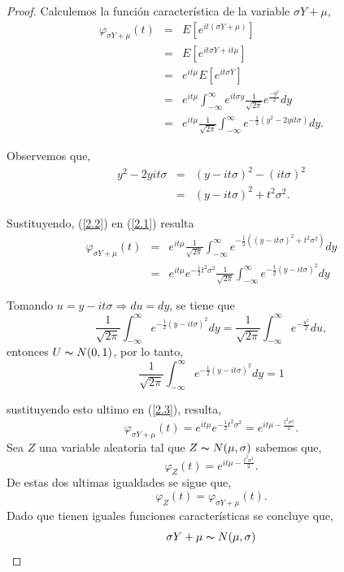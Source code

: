 \documentclass[
  letterpaper,
  DIV=11,
  numbers=noendperiod]{scrreprt}
\theoremstyle{definition}
\theoremstyle{plain}
\theoremstyle{remark}
\begin{document}
\begin{proof}

Calculemos la función característica de la variable \(\sigma Y+\mu\),
\begin{eqnarray}\label{2.1}
\varphi_{\sigma Y+\mu}(t) & = & E\left[e^{it(\sigma Y+\mu)}\right]\nonumber\\
& = & E\left[e^{it\sigma Y+it\mu}\right]\nonumber\\
& = & e^{it\mu}E\left[e^{it\sigma Y}\right]\nonumber\\
& = & e^{it\mu}\int_{-\infty}^{\infty}e^{it\sigma y}\frac{1}{\sqrt{2\pi}}e^{\frac{-y^{2}}{2}}dy\nonumber\\
& = & e^{it\mu}\frac{1}{\sqrt{2\pi}}\int_{-\infty}^{\infty}e^{-\frac{1}{2}(y^{2}-2yit\sigma) }dy.
\end{eqnarray}

Observemos que, \begin{eqnarray}\label{2.2}
y^{2}-2yit\sigma & = & (y-it\sigma)^{2}-(it\sigma)^{2}\nonumber\\
& = & (y-it\sigma)^{2}+t^{2}\sigma^{2}.
\end{eqnarray}

Sustituyendo, (\ref{2.2}) en (\ref{2.1}) resulta
\begin{eqnarray}\label{2.3}
\varphi_{\sigma Y+\mu}(t) & = & e^{it\mu}\frac{1}{\sqrt{2\pi}}\int_{-\infty}^{\infty}e^{-\frac{1}{2}((y-it\sigma)^{2}+t^{2}\sigma^{2}) }dy\nonumber\\
& = & e^{it\mu}e^{-\frac{1}{2}t^{2}\sigma^{2}}\frac{1}{\sqrt{2\pi}}\int_{-\infty}^{\infty}e^{-\frac{1}{2}(y-it\sigma)^{2} }dy
\end{eqnarray}

Tomando \(u=y-it\sigma\Longrightarrow du=dy\), se tiene que \[
\frac{1}{\sqrt{2\pi}}\int_{-\infty}^{\infty}e^{-\frac{1}{2}(y-it\sigma)^{2} }dy=\frac{1}{\sqrt{2\pi}}\int_{-\infty}^{\infty}e^{-\frac{u^{2} }{2}}du,
\] entonces \(U\thicksim N(0,1)\), por lo tanto, \[
\frac{1}{\sqrt{2\pi}}\int_{-\infty}^{\infty}e^{-\frac{1}{2}(y-it\sigma)^{2} }dy=1
\]

sustituyendo esto ultimo en (\ref{2.3}), resulta, \[ 
\varphi_{\sigma Y+\mu}(t)=e^{it\mu}e^{-\frac{1}{2}t^{2}\sigma^{2}}=e^{it\mu-\frac{t^{2}\sigma^{2}}{2}}.
\] Sea \(Z\) una variable aleatoria tal que \(Z\thicksim N(\mu,\sigma)\)
sabemos que, \[ 
\varphi_{Z}(t)=e^{it\mu-\frac{t^{2}\sigma^{2}}{2}}.
\] De estas dos ultimas igualdades se sigue que, \[ 
\varphi_{Z}(t)=\varphi_{\sigma Y+\mu}(t).
\] Dado que tienen iguales funciones características se concluye que, \[
\sigma Y+\mu\thicksim N(\mu,\sigma)
\]

\end{proof}
\end{document}
